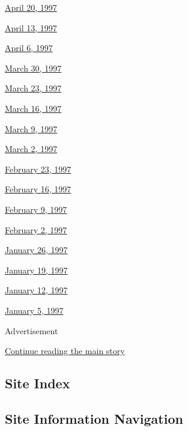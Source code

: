 \href{http://www.nytimes3xbfgragh.onion/books/97/04/20/home/contents.html}{April
20, 1997}

\href{http://www.nytimes3xbfgragh.onion/books/97/04/13/home/contents.html}{April
13, 1997}

\href{http://www.nytimes3xbfgragh.onion/books/97/04/06/home/contents.html}{April
6, 1997}

\href{http://www.nytimes3xbfgragh.onion/books/97/03/30/home/contents.html}{March
30, 1997}

\href{http://www.nytimes3xbfgragh.onion/books/97/03/23/home/contents.html}{March
23, 1997}

\href{http://www.nytimes3xbfgragh.onion/books/97/03/16/home/contents.html}{March
16, 1997}

\href{http://www.nytimes3xbfgragh.onion/books/97/03/09/home/contents.html}{March
9, 1997}

\href{http://www.nytimes3xbfgragh.onion/books/97/03/02/home/contents.html}{March
2, 1997}

\href{http://www.nytimes3xbfgragh.onion/books/97/02/23/home/contents.html}{February
23, 1997}

\href{http://www.nytimes3xbfgragh.onion/books/97/02/16/home/contents.html}{February
16, 1997}

\href{http://www.nytimes3xbfgragh.onion/books/97/02/09/home/contents.html}{February
9, 1997}

\href{http://www.nytimes3xbfgragh.onion/books/97/02/02/home/contents.html}{February
2, 1997}

\href{http://www.nytimes3xbfgragh.onion/books/97/01/26/home/contents.html}{January
26, 1997}

\href{http://www.nytimes3xbfgragh.onion/books/97/01/19/home/contents.html}{January
19, 1997}

\href{http://www.nytimes3xbfgragh.onion/books/97/01/12/home/contents.html}{January
12, 1997}

\href{http://www.nytimes3xbfgragh.onion/books/97/01/05/home/contents.html}{January
5, 1997}

Advertisement

\protect\hyperlink{after-bottom}{Continue reading the main story}

\hypertarget{site-index}{%
\subsection{Site Index}\label{site-index}}

\hypertarget{site-information-navigation}{%
\subsection{Site Information
Navigation}\label{site-information-navigation}}

